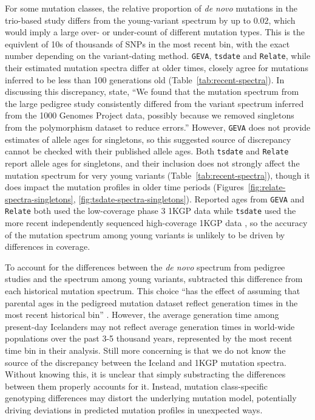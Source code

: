 \documentclass[]{article}
\newcommand{\GEVA}{\texttt{GEVA}\xspace}
\newcommand{\tsdate}{\texttt{tsdate}\xspace}
\newcommand{\relate}{\texttt{Relate}\xspace}
\begin{document}
For some mutation classes, the relative proportion of \emph{de novo} mutations
in the trio-based study differs from the young-variant spectrum by up to
$0.02$, which would imply a large over- or under-count of different mutation
types. This is the equivlent of 10s of thousands of SNPs in the most recent
bin, with the exact number depending on the variant-dating method.
\GEVA, \tsdate and \relate, while their estimated mutation spectra differ at
older times, closely agree for mutations inferred to be less than 100
generations old (Table~\ref{tab:recent-spectra}). In discussing this
discrepancy, \citet{wang2023human} state, ``We found that the mutation spectrum
from the large pedigree study consistently differed from the variant spectrum
inferred from the 1000 Genomes Project data, possibly because we removed
singletons from the polymorphism dataset to reduce errors.'' However, \GEVA does
not provide estimates of allele ages for singletons, so this suggested source
of discrepancy cannot be checked with their published allele ages. Both \tsdate
and \relate report allele ages for singletons, and their inclusion does not
strongly affect the mutation spectrum for very young variants
(Table~\ref{tab:recent-spectra}), though it does impact the mutation profiles
in older time periods (Figures~\ref{fig:relate-spectra-singletons},
\ref{fig:tsdate-spectra-singletons}). Reported ages from \GEVA and \relate both
used the low-coverage phase 3 1KGP data while \tsdate used the more recent
independently sequenced high-coverage 1KGP data \citep{byrska2022high}, so the
accuracy of the mutation spectrum among young variants is unlikely to be driven
by differences in coverage.

To account for the differences between the \emph{de novo} spectrum from
pedigree studies \citep{jonsson2017parental} and the spectrum among young
variants, \citet{wang2023human} subtracted this difference from each historical
mutation spectrum. This choice ``has the effect of assuming that parental ages
in the pedigreed mutation dataset reflect generation times in the most recent
historical bin'' \citep{wang2023human}. However, the average generation time
among present-day Icelanders may not reflect average generation times in
world-wide populations over the past 3-5 thousand years, represented by the
most recent time bin in their analysis. Still more concerning is that we do not
know the source of the discrepancy between the Iceland and 1KGP mutation
spectra. Without knowing this, it is unclear that simply substracting the
differences between them properly accounts for it. Instead, mutation
class-specific genotyping differences may distort the underlying mutation
model, potentially driving deviations in predicted mutation profiles in
unexpected ways.
\end{document}
